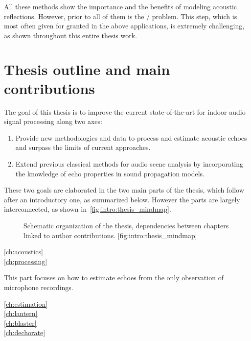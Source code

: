 \mynewline
All these methods show the importance and the benefits of modeling acoustic reflections.
However, prior to all of them is the \AERdef/ problem.
This step, which is most often given for granted in the above applications, is extremely challenging, as shown throughout this entire thesis work.

\section{Thesis outline and main contributions}
The goal of this thesis is to improve the current state-of-the-art for indoor audio signal processing along two axes:
\begin{enumerate}
    \item Provide new methodologies and data to process and estimate acoustic echoes and surpass the limits of current approaches.
    \item Extend previous classical methods for audio scene analysis by incorporating the knowledge of echo properties in sound propagation models.
\end{enumerate}
These two goals are elaborated in the two main parts of the thesis, which follow after an introductory one, as summarized below.
However the parts are largely interconnected, as shown in~\cref{fig:intro:thesis_mindmap}.

\begin{figure}[t]
    \begin{sidecaption}{%
        Schematic organization of the thesis, dependencies between chapters linked to author contributions.
    }[fig:intro:thesis_mindmap]
    \centering
    \resizebox{\linewidth}{!}{
        
    }
    \end{sidecaption}
\end{figure}


\begin{description}
    \item[\cref{ch:acoustics}]\synopsisChAcoustics
    \item[\cref{ch:processing}]\synopsisChProcessing
\end{description}

This part focuses on how to estimate echoes from the only observation of microphone recordings.
\begin{description}
    \item[\cref{ch:estimation}]\synopsisChEstimation
    \item[\cref{ch:lantern}]\synopsisChLantern
    \item[\cref{ch:blaster}]\synopsisChBlaster
    \item[\cref{ch:dechorate}]\synopsisChDechorate
\end{description}


